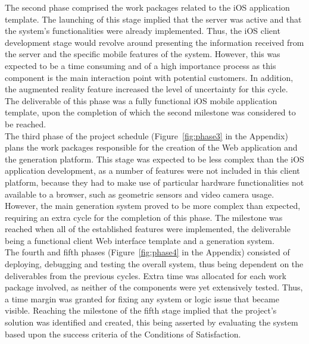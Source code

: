 The second phase comprised the work packages related to the iOS application template. The launching of this stage implied that the server was active and that the system's functionalities were already implemented. Thus, the iOS client development stage would revolve around presenting the information received from the server and the specific mobile features of the system. However, this was expected to be a time consuming and of a high importance process as this component is the main interaction point with potential customers. In addition, the augmented reality feature increased the level of uncertainty for this cycle. The deliverable of this phase was a fully functional iOS mobile application template, upon the completion of which the second milestone was considered to be reached.\\

The third phase of the project schedule (Figure~\ref{fig:phase3} in the Appendix) plans the work packages responsible for the creation of the Web application and the generation platform. This stage was expected to be less complex than the iOS application development, as a number of features were not included in this client platform, because they had to make use of particular hardware functionalities not available to a browser, such as geometric sensors and video camera usage. However, the main generation system proved to be more complex than expected, requiring an extra cycle for the completion of this phase. The milestone was reached when all of the established features were implemented, the deliverable being a functional client Web interface template and a generation system.\\

The fourth and fifth phases (Figure~\ref{fig:phase4} in the Appendix) consisted of deploying, debugging and testing the overall system, thus being dependent on the deliverables from the previous cycles. Extra time was allocated for each work package involved, as neither of the components were yet extensively tested. Thus, a time margin was granted for fixing any system or logic issue that became visible. Reaching the milestone of the fifth stage implied that the project's solution was identified and created, this being asserted by evaluating the system based upon the success criteria of the Conditions of Satisfaction.

